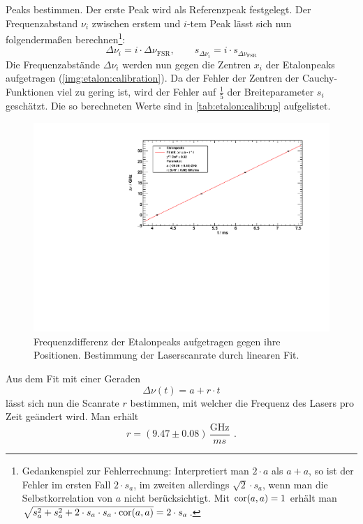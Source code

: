 Peaks bestimmen. Der erste Peak wird als Referenzpeak festgelegt. Der Frequenzabstand $\nu_i$ zwischen erstem und $i$-tem Peak lässt sich nun
folgendermaßen berechnen\footnote{Gedankenspiel zur Fehlerrechnung: Interpretiert man $2 \cdot a$ als $a + a$, so ist der Fehler im ersten Fall $2 \cdot s_a$, im zweiten
allerdings $\sqrt{2} \cdot s_a$, wenn man die Selbstkorrelation von $a$ nicht berücksichtigt. Mit $\operatorname{cor}(a, a) = 1$
erhält man $\sqrt{s_a^2 + s_a^2 + 2 \cdot s_a \cdot s_a \cdot \operatorname{cor}(a, a)} = 2 \cdot s_a$.}:
\begin{equation}
    \Delta \nu_i = i \cdot \Delta \nu_\text{FSR}, \qquad s_{\Delta \nu_i} = i \cdot s_{\Delta \nu_\text{FSR}}
\end{equation}
Die Frequenzabstände $\Delta \nu_i$ werden nun gegen die Zentren $x_i$  der
Etalonpeaks aufgetragen (\autoref{img:etalon:calibration}). Da der Fehler der Zentren der Cauchy-Funktionen viel zu gering ist, wird der Fehler
auf $\frac{1}{5}$ der Breiteparameter $s_i$ geschätzt. Die so berechneten Werte sind in \autoref{tab:etalon:calib:up} aufgelistet.

\begin{figure}[H]
\begin{center}
    \includegraphics[width=\textwidth]{../img/part2/up-etalon_zoom-etalon_calibration.pdf}
    \caption{Frequenzdifferenz der Etalonpeaks aufgetragen gegen ihre Positionen. Bestimmung der Laserscanrate durch linearen Fit.}
    \label{img:etalon:calibration}
\end{center}
\end{figure}
Aus dem Fit mit einer Geraden
\begin{equation}
    \Delta \nu(t) = a + r \cdot t 
\end{equation}
lässt sich nun die Scanrate $r$ bestimmen, mit welcher die Frequenz des Lasers pro Zeit geändert wird. Man erhält
\begin{equation}
    r = (9.47 \pm 0.08)\,\frac{\text{GHz}}{ms}\ \, .
\end{equation}

